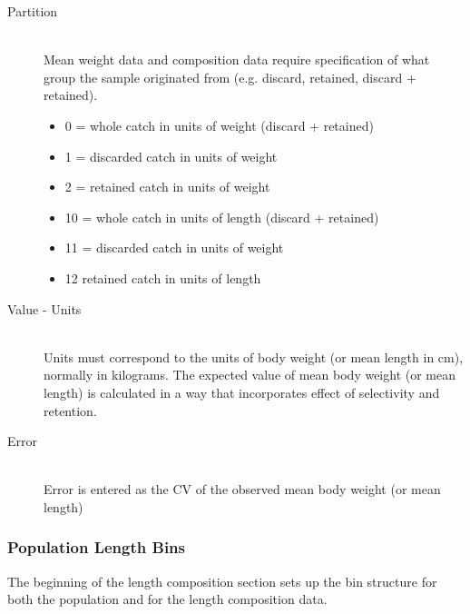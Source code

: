 \begin{description}
	\item[Partition]\hfill\\
	Mean weight data and composition data require specification of what group the sample originated from (e.g. discard, retained, discard + retained).
	\begin{itemize}
		\item 0 = whole catch in units of weight (discard + retained)
		\item 1 = discarded catch in units of weight
		\item 2 = retained catch in units of weight
		\item 10 = whole catch in units of length (discard + retained)
		\item 11 = discarded catch in units of weight
		\item 12 retained catch in units of length
	\end{itemize}
	\item[Value - Units]\hfill\\
	Units must correspond to the units of body weight (or mean length in cm), normally in kilograms.  The expected value of mean body weight (or mean length) is calculated in a way that incorporates effect of selectivity and retention.
	\item[Error]\hfill\\
	Error is entered as the CV of the observed mean body weight (or mean length)
\end{description}

\subsubsection{Population Length Bins}
The beginning of the length composition section sets up the bin structure for both the population and for the length composition data.

